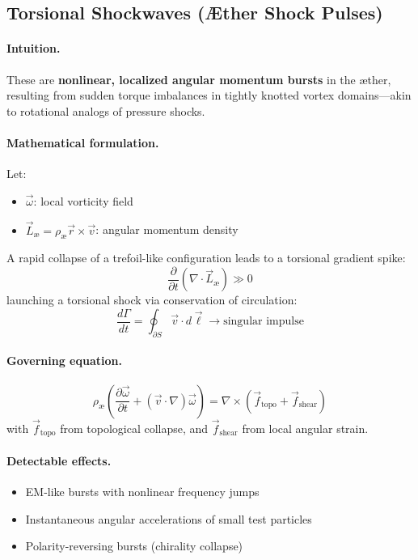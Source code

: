 \documentclass[12pt]{article}
\begin{document}
\subsection{Torsional Shockwaves (Æther Shock Pulses)}

\paragraph{Intuition.} These are \textbf{nonlinear, localized angular momentum bursts} in the \ae{}ther, resulting from sudden torque imbalances in tightly knotted vortex domains—akin to rotational analogs of pressure shocks.

\paragraph{Mathematical formulation.} Let:
\begin{itemize}
  \item \( \vec{\omega} \): local vorticity field
  \item \( \vec{L}_\text{\ae} = \rho_\text{\ae} \vec{r} \times \vec{v} \): angular momentum density
\end{itemize}

A rapid collapse of a trefoil-like configuration leads to a torsional gradient spike:
\[
\frac{\partial}{\partial t} \left( \nabla \cdot \vec{L}_\text{\ae} \right) \gg 0
\]
launching a torsional shock via conservation of circulation:
\[
\frac{d\Gamma}{dt} = \oint_{\partial S} \vec{v} \cdot d\vec{\ell} \rightarrow \text{singular impulse}
\]

\paragraph{Governing equation.}
\[
\boxed{
\rho_\text{\ae} \left( \frac{\partial \vec{\omega}}{\partial t}
+ (\vec{v} \cdot \nabla) \vec{\omega} \right)
= \nabla \times \left( \vec{f}_{\text{topo}} + \vec{f}_{\text{shear}} \right)
}
\]
with \( \vec{f}_{\text{topo}} \) from topological collapse, and \( \vec{f}_{\text{shear}} \) from local angular strain.

\paragraph{Detectable effects.}
\begin{itemize}
  \item EM-like bursts with nonlinear frequency jumps
  \item Instantaneous angular accelerations of small test particles
  \item Polarity-reversing bursts (chirality collapse)
\end{itemize}
\end{document}
